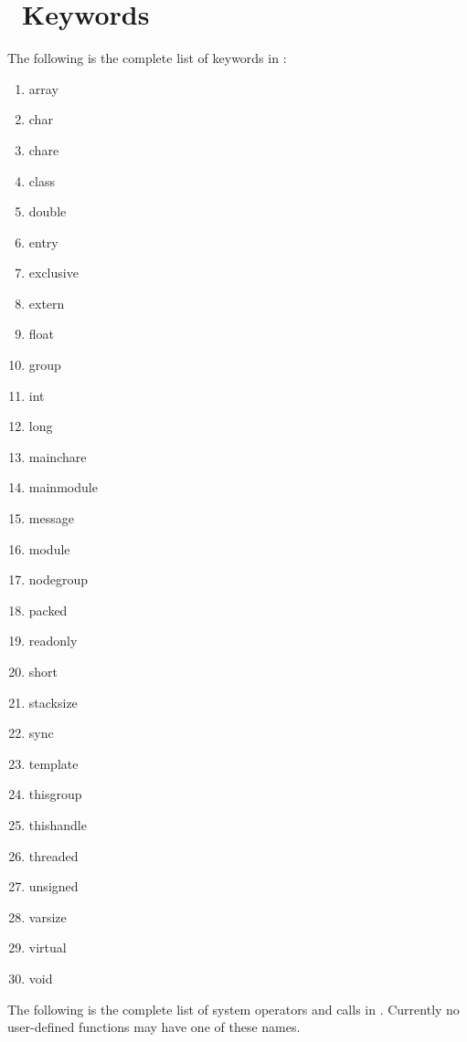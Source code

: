\section{\charmpp\ Keywords}
The following is the complete list of keywords in \charmpp:

\begin{enumerate}
\item array
\item char
\item chare
\item class
\item double
\item entry
\item exclusive
\item extern
\item float
\item group
\item int
\item long
\item mainchare
\item mainmodule
\item message
\item module
\item nodegroup
\item packed
\item readonly
\item short
\item stacksize
\item sync 
\item template
\item thisgroup
\item thishandle
\item threaded
\item unsigned 
\item varsize
\item virtual
\item void
\end{enumerate}

The following is the complete list of system operators and calls in \charmpp.
Currently no user-defined functions may have one of these names.


